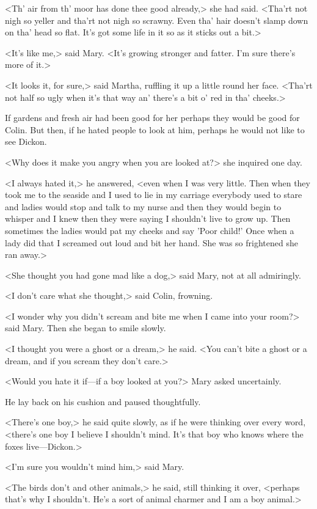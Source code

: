 <Th' air from th' moor has done thee good already,> she had said. <Tha'rt not nigh so yeller and tha'rt not nigh so scrawny. Even tha' hair doesn't slamp down on tha' head so flat. It's got some life in it so as it sticks out a bit.>

<It's like me,> said Mary. <It's growing stronger and fatter. I'm sure there's more of it.>

<It looks it, for sure,> said Martha, ruffling it up a little round her face. <Tha'rt not half so ugly when it's that way an' there's a bit o' red in tha' cheeks.>

If gardens and fresh air had been good for her perhaps they would be good for Colin. But then, if he hated people to look at him, perhaps he would not like to see Dickon.

<Why does it make you angry when you are looked at?> she inquired one day.

<I always hated it,> he answered, <even when I was very little. Then when they took me to the seaside and I used to lie in my carriage everybody used to stare and ladies would stop and talk to my nurse and then they would begin to whisper and I knew then they were saying I shouldn't live to grow up. Then sometimes the ladies would pat my cheeks and say 'Poor child!' Once when a lady did that I screamed out loud and bit her hand. She was so frightened she ran away.>

<She thought you had gone mad like a dog,> said Mary, not at all admiringly.

<I don't care what she thought,> said Colin, frowning.

<I wonder why you didn't scream and bite me when I came into your room?> said Mary. Then she began to smile slowly.

<I thought you were a ghost or a dream,> he said. <You can't bite a ghost or a dream, and if you scream they don't care.>

<Would you hate it if—if a boy looked at you?> Mary asked uncertainly.

He lay back on his cushion and paused thoughtfully.

<There's one boy,> he said quite slowly, as if he were thinking over every word, <there's one boy I believe I shouldn't mind. It's that boy who knows where the foxes live—Dickon.>

<I'm sure you wouldn't mind him,> said Mary.

<The birds don't and other animals,> he said, still thinking it over, <perhaps that's why I shouldn't. He's a sort of animal charmer and I am a boy animal.>

